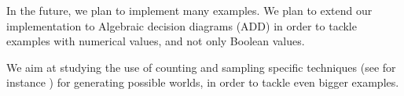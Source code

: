 In the future, we plan to implement many examples. We plan to extend our implementation to Algebraic decision diagrams (ADD) \cite{DBLP:journals/fmsd/BaharFGHMPS97} in order to tackle examples with numerical values, and not only Boolean values.

We aim at studying the use of counting and sampling specific techniques (see for instance \cite{DBLP:conf/aaai/MeelVCFSFIM16}) for generating possible worlds, in order to tackle even bigger examples.

